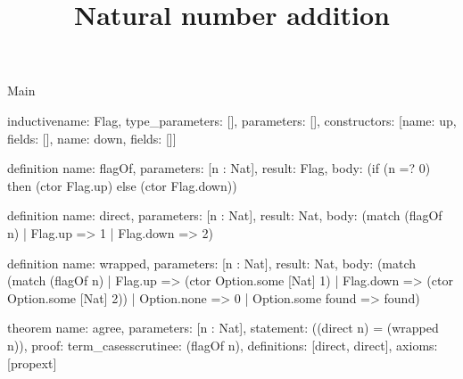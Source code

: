\begin{lexlean}{Main}
\title{Natural number addition}
\begin{semanticmodule}
inductive{name: Flag, type_parameters: [], parameters: [], constructors: [{name: up, fields: []}, {name: down, fields: []}]}

definition{
  name: flagOf,
  parameters: [n : Nat],
  result: Flag,
  body: (if (n =? 0) then (ctor Flag.up) else (ctor Flag.down))
}

definition{
  name: direct,
  parameters: [n : Nat],
  result: Nat,
  body: (match (flagOf n)
    | Flag.up => 1
    | Flag.down => 2)
}

definition{
  name: wrapped,
  parameters: [n : Nat],
  result: Nat,
  body: (match (match (flagOf n)
    | Flag.up => (ctor Option.some [Nat] 1)
    | Flag.down => (ctor Option.some [Nat] 2))
    | Option.none => 0
    | Option.some found => found)
}

theorem{
  name: agree,
  parameters: [n : Nat],
  statement: ((direct n) = (wrapped n)),
  proof: term_cases{scrutinee: (flagOf n), definitions: [direct, direct]},
  axioms: [propext]
}
\end{semanticmodule}
\end{lexlean}
